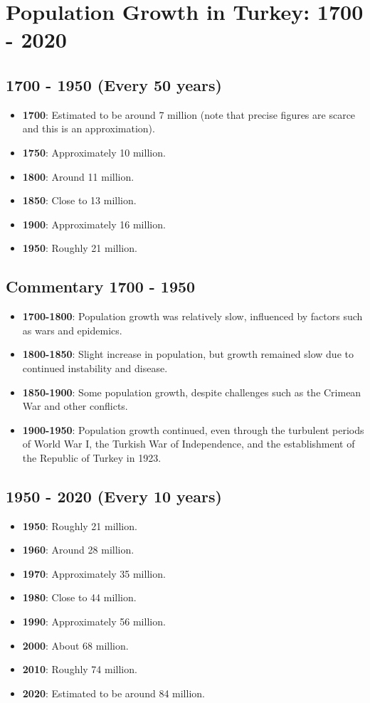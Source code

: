 \section{Population Growth in Turkey: 1700 - 2020}

\subsection*{1700 - 1950 (Every 50 years)}
\begin{itemize}
    \item \textbf{1700}: Estimated to be around 7 million (note that precise figures are scarce and this is an approximation).
    \item \textbf{1750}: Approximately 10 million.
    \item \textbf{1800}: Around 11 million.
    \item \textbf{1850}: Close to 13 million.
    \item \textbf{1900}: Approximately 16 million.
    \item \textbf{1950}: Roughly 21 million.
\end{itemize}

\subsection*{Commentary 1700 - 1950}
\begin{itemize}
    \item \textbf{1700-1800}: Population growth was relatively slow, influenced by factors such as wars and epidemics.
    \item \textbf{1800-1850}: Slight increase in population, but growth remained slow due to continued instability and disease.
    \item \textbf{1850-1900}: Some population growth, despite challenges such as the Crimean War and other conflicts.
    \item \textbf{1900-1950}: Population growth continued, even through the turbulent periods of World War I, the Turkish War of Independence, and the establishment of the Republic of Turkey in 1923.
\end{itemize}

\subsection*{1950 - 2020 (Every 10 years)}
\begin{itemize}
    \item \textbf{1950}: Roughly 21 million.
    \item \textbf{1960}: Around 28 million.
    \item \textbf{1970}: Approximately 35 million.
    \item \textbf{1980}: Close to 44 million.
    \item \textbf{1990}: Approximately 56 million.
    \item \textbf{2000}: About 68 million.
    \item \textbf{2010}: Roughly 74 million.
    \item \textbf{2020}: Estimated to be around 84 million.
\end{itemize}


